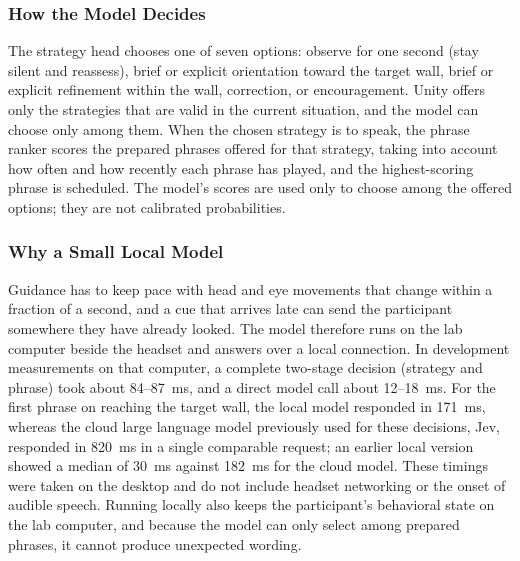 \subsubsection{How the Model Decides}
The strategy head chooses one of seven options: observe for one second (stay silent and reassess), brief or explicit orientation toward the target wall, brief or explicit refinement within the wall, correction, or encouragement. Unity offers only the strategies that are valid in the current situation, and the model can choose only among them. When the chosen strategy is to speak, the phrase ranker scores the prepared phrases offered for that strategy, taking into account how often and how recently each phrase has played, and the highest-scoring phrase is scheduled. The model's scores are used only to choose among the offered options; they are not calibrated probabilities.

\subsubsection{Why a Small Local Model}
\label{sec:small-local-model}
Guidance has to keep pace with head and eye movements that change within a fraction of a second, and a cue that arrives late can send the participant somewhere they have already looked. The model therefore runs on the lab computer beside the headset and answers over a local connection. In development measurements on that computer, a complete two-stage decision (strategy and phrase) took about 84--87~ms, and a direct model call about 12--18~ms. For the first phrase on reaching the target wall, the local model responded in 171~ms, whereas the cloud large language model previously used for these decisions, Jev, responded in 820~ms in a single comparable request; an earlier local version showed a median of 30~ms against 182~ms for the cloud model. These timings were taken on the desktop and do not include headset networking or the onset of audible speech. Running locally also keeps the participant's behavioral state on the lab computer, and because the model can only select among prepared phrases, it cannot produce unexpected wording.

